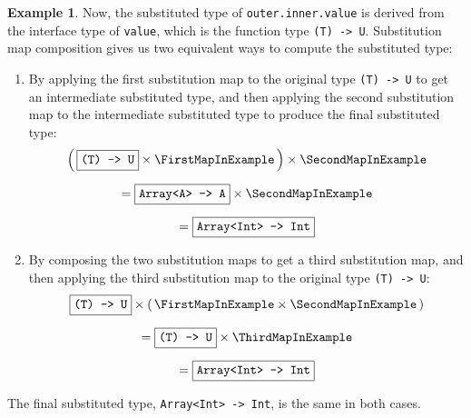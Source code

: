 \documentclass[a4paper,headsepline,bibliography=totoc,toc=flat,fleqn,twoside=semi]{scrbook}
\theoremstyle{definition}
\theoremstyle{definition}
\newtheorem{example}{Example}[chapter]
\theoremstyle{definition}
\newcommand{\ttbox}[1]{\boxed{\mbox{\vphantom{pI\texttt{pI}}\texttt{#1}}}}
\begin{document}
\begin{example}
Now, the substituted type of \texttt{outer.inner.value} is derived from the interface type of \texttt{value}, which is the function type \verb|(T) -> U|. Substitution map composition gives us  two equivalent ways to compute the substituted type:
\begin{enumerate}
\item By applying the first substitution map to the original type \verb|(T) -> U| to get an intermediate substituted type, and then applying the second substitution map to the intermediate substituted type to produce the final substituted type:
\begin{gather*}
\left(\,\ttbox{(T) -> U}\times\FirstMapInExample\,\right)\times \SecondMapInExample\\[\medskipamount]
= \ttbox{Array<A> -> A}\times \SecondMapInExample\\[\medskipamount]
= \ttbox{Array<Int> -> Int}
\end{gather*}
\item By composing the two substitution maps to get a third substitution map, and then applying the third substitution map to the original type \texttt{(T) -> U}:
\begin{gather*}
\ttbox{(T) -> U}\times\left(\,\FirstMapInExample\times \SecondMapInExample\,\right)\\[\medskipamount]
= \ttbox{(T) -> U}\times \ThirdMapInExample\\[\medskipamount]
= \ttbox{Array<Int> -> Int}
\end{gather*}
\end{enumerate}
The final substituted type, \texttt{Array<Int> -> Int}, is the same in both cases.
\end{example}
\end{document}
